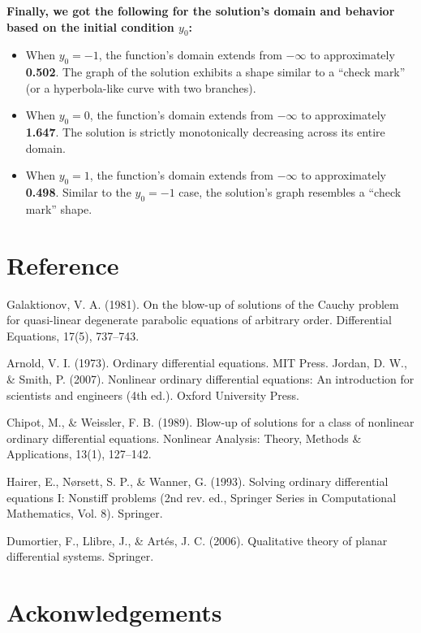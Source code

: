 \documentclass{article}
\begin{document}
\textbf{Finally, we got the following for the solution's domain and behavior based on the initial condition $y_0$:}

\begin{itemize}
    \item When \textbf{$y_0 = -1$}, the function's domain extends from $-\infty$ to approximately \textbf{0.502}. The graph of the solution exhibits a shape similar to a ``check mark'' (or a hyperbola-like curve with two branches).
    \item When \textbf{$y_0 = 0$}, the function's domain extends from $-\infty$ to approximately \textbf{1.647}. The solution is strictly monotonically decreasing across its entire domain.
    \item When \textbf{$y_0 = 1$}, the function's domain extends from $-\infty$ to approximately \textbf{0.498}. Similar to the $y_0 = -1$ case, the solution's graph resembles a ``check mark'' shape.
\end{itemize}



\section{Reference}


Galaktionov, V. A. (1981). On the blow-up of solutions of the Cauchy problem for quasi-linear degenerate parabolic equations of arbitrary order. Differential Equations, 17(5), 737–743.

Arnold, V. I. (1973). Ordinary differential equations. MIT Press.
Jordan, D. W., & Smith, P. (2007). Nonlinear ordinary differential equations: An introduction for scientists and engineers (4th ed.). Oxford University Press.

Chipot, M., & Weissler, F. B. (1989). Blow-up of solutions for a class of nonlinear ordinary differential equations. Nonlinear Analysis: Theory, Methods & Applications, 13(1), 127–142.

Hairer, E., Nørsett, S. P., & Wanner, G. (1993). Solving ordinary differential equations I: Nonstiff problems (2nd rev. ed., Springer Series in Computational Mathematics, Vol. 8). Springer.

Dumortier, F., Llibre, J., & Artés, J. C. (2006). Qualitative theory of planar differential systems. Springer.




\section{Ackonwledgements}
\end{document}
